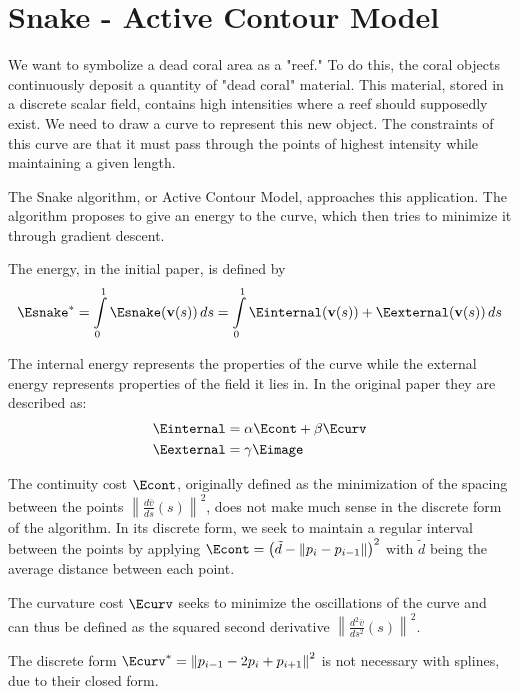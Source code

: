 \chapter{Snake - Active Contour Model}

We want to symbolize a dead coral area as a  "reef." To do this, the coral objects continuously deposit a quantity of "dead coral" material. This material, stored in a discrete scalar field, contains high intensities where a reef should supposedly exist. 
We need to draw a curve to represent this new object. The constraints of this curve are that it must pass through the points of highest intensity while maintaining a given length.

The Snake algorithm, or Active Contour Model, approaches this application. The algorithm proposes to give an energy to the curve, which then tries to minimize it through gradient descent.

The energy, in the initial paper, is defined by
\begin{align}
    \Esnake^{*} = \int \limits _{0}^{1} { \Esnake(\mathbf {v} (s))\,ds } = \int \limits _{0}^{1} { \Einternal (\mathbf {v} (s)) + \Eexternal (\mathbf {v} (s)) } \,ds
\end{align}

The internal energy represents the properties of the curve while the external energy represents properties of the field it lies in. In the original paper they are described as: 
\begin{align}
    \Einternal &= \alpha \Econt + \beta \Ecurv \\
    \Eexternal &= \gamma \Eimage
\end{align}

The continuity cost $\Econt$, originally defined as the minimization of the spacing between the points $\left\|{\frac {d{\bar {v}}}{ds}}(s)\right\| ^{2}$, does not make much sense in the discrete form of the algorithm. In its discrete form, we seek to maintain a regular interval between the points by applying $\Econt = \left(\tilde{d} - \left\|p_i - p_{i-1} \right\| \right)^2$ with $\tilde{d}$ being the average distance between each point.

The curvature cost $\Ecurv$ seeks to minimize the oscillations of the curve and can thus be defined as the squared second derivative $\left\|{\frac {d^{2}{\bar {v}}}{ds^{2}}}(s)\right\| ^{2}$.

The discrete form $\Ecurv^{*} = \left\| p_{i-1} - 2 p_i + p_{i+1} \right\| ^2$ is not necessary with splines, due to their closed form.

